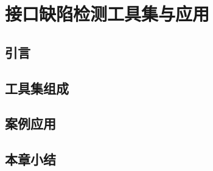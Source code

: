 \chapter{接口缺陷检测工具集与应用}
\label{cha:tools}

\section{引言}
\section{工具集组成}
\section{案例应用}
\section{本章小结}
